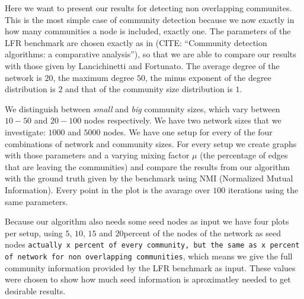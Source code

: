 Here we want to present our results for detecting non overlapping communites. This is the most simple case of community detection because we now exactly in how many communities a node is included, exactly one. The parameters of the LFR benchmark are chosen exactly as in (CITE: ``Community detection algorithms: a comparative analysis''), so that we are able to compare our results with those given by Lancichinetti and Fortunato. The average degree of the network is $20$, the maximum degree $50$, the minus exponent of the degree distribution is $2$ and that of the community size distribution is $1$.

We distinguish between \textit{small} and \textit{big} community sizes, which vary between $10 - 50$ and $20 - 100$ nodes respectively. We have two network sizes that we investigate: $1000$ and $5000$ nodes. We have one setup for every of the four combinations of network and community sizes. For every setup we create graphs with those parameters and a varying mixing factor $\mu$ (the percentage of edges that are leaving the communities) and compare the results from our algorithm with the ground truth given by the benchmark using NMI (Normalized Mutual Information). Every point in the plot is the avarage over $100$ iterations using the same parameters.

Because our algorithm also needs some seed nodes as input we have four plots per setup, using $5$, $10$, $15$ and $20$percent of the nodes of the network as seed nodes {\tt actually x percent of every community, but the same as x percent of network for non overlapping communities}, which means we give the full community information provided by the LFR benchmark as input. These values were chosen to show how much seed information is aproximatley needed to get desirable results.